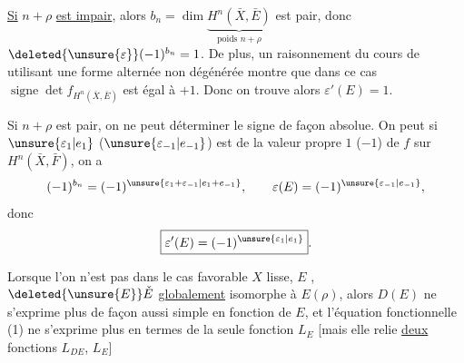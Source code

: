 \uline{Si} $n+\rho$ \uline{est impair}, alors $b_n=\dim\underbrace{H^n(\bar X,\bar E)}_{\text{poids }n+\rho}$ est pair, donc $\deleted{\unsure{\varepsilon}}(-1)^{b_n}=1$. De plus, un raisonnement du cours de  utilisant une forme alternée non dégénérée  montre que dans ce cas $\operatorname{signe}\det f_{H^n(\bar X,\bar E)}$ est égal à $+1$. Donc on trouve alors $\varepsilon'(E)=1$.

Si $n+\rho$ est pair, on ne peut déterminer le signe de façon absolue. On peut  
si $\unsure{\varepsilon_1|e_1}$ ($\unsure{\varepsilon_{-1}|e_{-1}}$) est    de  la valeur propre $1$ ($-1$) de $f$ sur $H^n(\bar X,\bar F)$, on a
\[
(-1)^{b_n}=(-1)^{\unsure{\varepsilon_1+\varepsilon_{-1}|e_1+e_{-1}}},\qquad\varepsilon(E)=(-1)^{\unsure{\varepsilon_{-1}|e_{-1}}},
\]
donc
\[\boxed{\varepsilon'(E)=(-1)^{\unsure{\varepsilon_1|e_1}}}.\]

Lorsque l'on n'est pas dans le cas favorable $X$ lisse, $E$  , $\deleted{\unsure{E}}\check E$ \uline{globalement} isomorphe à $E(\rho)$, alors $D(E)$ ne s'exprime plus de façon aussi simple en fonction de $E$, et l'équation fonctionnelle (1) ne s'exprime plus  en termes de la seule fonction $L_E$ [mais elle relie \uline{deux} fonctions $L_{DE}$, $L_E$]
